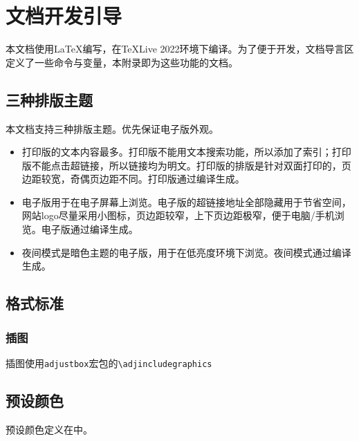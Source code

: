 \chapter{文档开发引导}

本文档使用\LaTeX 编写，在TeXLive 2022环境下编译。为了便于开发，文档导言区定义了一些命令与变量，本附录即为这些功能的文档。

\section{三种排版主题}

本文档支持三种排版主题。优先保证电子版外观。

\begin{itemize}
	\item 打印版的文本内容最多。打印版不能用文本搜索功能，所以添加了索引；打印版不能点击超链接，所以链接均为明文。打印版的排版是针对双面打印的，页边距较宽，奇偶页边距不同。打印版通过编译生成。
	\item 电子版用于在电子屏幕上浏览。电子版的超链接地址全部隐藏用于节省空间，网站logo尽量采用小图标，页边距较窄，上下页边距极窄，便于电脑/手机浏览。电子版通过编译生成。
	\item 夜间模式是暗色主题的电子版，用于在低亮度环境下浏览。夜间模式通过编译生成。
\end{itemize}

\section{格式标准}

\subsection{插图}
插图使用\lstinline{adjustbox}宏包的\lstinline{\adjincludegraphics}

\section{预设颜色}

预设颜色定义在中。

